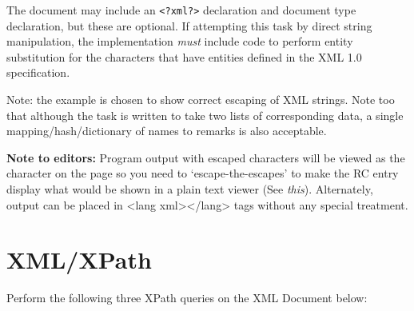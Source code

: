 The document may include an \texttt{\textless{}?xml?\textgreater{}}
declaration and document type declaration, but these are optional. If
attempting this task by direct string manipulation, the implementation
\emph{must} include code to perform entity substitution for the
characters that have entities defined in the XML 1.0 specification.

Note: the example is chosen to show correct escaping of XML strings.
Note too that although the task is written to take two lists of
corresponding data, a single mapping/hash/dictionary of names to remarks
is also acceptable.

\pagebreak{}

\textbf{Note to editors:} Program output with escaped characters will be
viewed as the character on the page so you need to `escape-the-escapes'
to make the RC entry display what would be shown in a plain text viewer
(See \emph{this}).
Alternately, output can be placed in \textless{}lang
xml\textgreater{}\textless{}/lang\textgreater{} tags without any special
treatment.




\pagebreak{}
\section*{XML/XPath}

Perform the following three XPath queries on the XML Document below:

